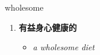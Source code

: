 
\begin{frame}
{\huge wholesome}
\begin{center}
\begin{enumerate}\Large
  \item \textbf{有益身心健康的}
  \begin{itemize}
    \item \em{\Large{a wholesome diet}}
  \end{itemize}
\end{enumerate}
\end{center}
\end{frame}
